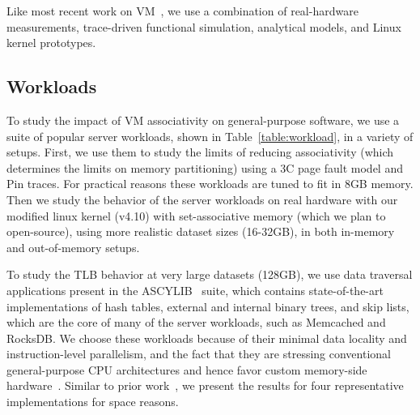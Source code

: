 Like most recent work on VM~\cite{basu:efficient, pham:increasing, pham:colt, bhattacharjee:large-reach, barr:spectlb, papadopoulou:prediction-based, saulsbury:recently-based}, we use a combination of real-hardware measurements, trace-driven functional simulation, analytical models, and Linux kernel prototypes.

\subsection{Workloads}
To study the impact of VM associativity on general-purpose software,
we use a suite of popular server workloads, shown in
Table~\ref{table:workload}, in a variety of setups. First, we use them
to study the limits of reducing associativity (which determines the
limits on memory partitioning) using a 3C page fault model and Pin
traces. For practical reasons these workloads are tuned to fit in 8GB
memory. Then we study the behavior of the server workloads on real
hardware with our modified linux kernel (v4.10) with set-associative
memory (which we plan to open-source), using more realistic dataset
sizes (16-32GB), in both in-memory and out-of-memory setups.

To study the TLB behavior at very large datasets (128GB), we use  data traversal applications present in the ASCYLIB~\cite{david:asynchronized} suite, which contains state-of-the-art implementations of hash tables, external and internal binary trees, and skip lists, which are the core of many of the server workloads, such as Memcached and RocksDB. We choose these workloads because of their minimal data locality and instruction-level parallelism, and the fact that they are stressing conventional general-purpose CPU architectures and hence favor custom memory-side hardware~\cite{ haria:devirtualizing, picorel:near-memory, kocberber:meet, hsieh:accelerating}. Similar to prior work~\cite{picorel:near-memory}, we present the results for four representative implementations for space reasons. 



